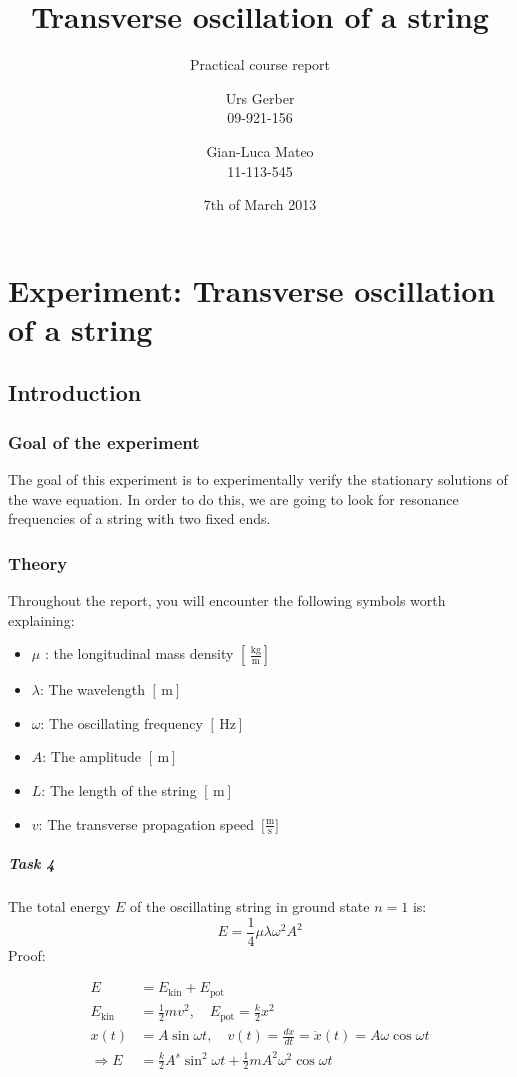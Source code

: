 \documentclass{scrreprt}
\author{Urs Gerber\\09-921-156 \and Gian-Luca Mateo\\11-113-545}
\date{7th of March 2013}
\title{Transverse oscillation of a string}
\subtitle{Practical course report}
\newcommand{\unit}[1]{\ensuremath{\, \mathrm{#1}}}
\begin{document}
\maketitle

\tableofcontents
\newpage

\chapter{Experiment: Transverse oscillation of a string}
\section{Introduction}

\subsection{Goal of the experiment}
The goal of this experiment is to experimentally verify the stationary solutions of the wave equation. In order to do this, we are going to look for resonance frequencies of a string with two fixed ends.
\subsection{Theory}
Throughout the report, you will encounter the following symbols worth explaining:
\begin{itemize}
\item $\mu$ : the longitudinal mass density $[\unit{\frac{kg}{m}}]$
\item $\lambda$: The wavelength $[\unit{m}]$
\item $\omega$: The oscillating frequency $[\unit{Hz}]$
\item $A$: The amplitude $[\unit{m}]$
\item $L$: The length of the string $[\unit{m}]$
\item $v$: The transverse propagation speed $\unit{[\frac{m}{s}}]$
\end{itemize}

\paragraph{Task 4}
The total energy $E$ of the oscillating string in ground state $n=1$ is:
\begin{equation}
E=\frac{1}{4} \mu \lambda \omega^2 A^2
\end{equation}
Proof:

\begin{align}
E &= E_{\text{kin}} + E_{\text{pot}}\\
E_{\text{kin}} &= \frac{1}{2} m v^2 , \quad E_{\text{pot}} = \frac{k}{2} x^2\\
x(t) &= A \sin{\omega t} , \quad v(t) = \frac{dx}{dt} = \dot{x}(t) = A \omega \cos{\omega t}\\
\Rightarrow E &= \frac{k}{2} A^s \sin^2{\omega t} + \frac{1}{2} m A^2 \omega^2 \cos{\omega t}
\end{align}
\end{document}
